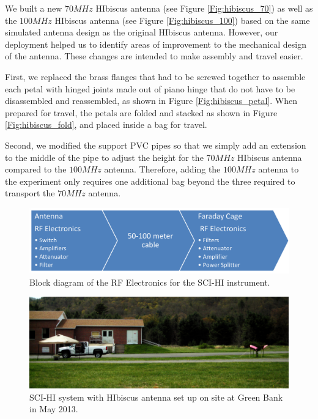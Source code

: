 We built a new $70 MHz$ HIbiscus antenna (see Figure \ref{Fig:hibiscus_70}) as well as the $100 MHz$ HIbiscus antenna (see Figure \ref{Fig:hibiscus_100}) based on the same simulated antenna design as the original HIbiscus antenna. However, our deployment helped us to identify areas of improvement to the mechanical design of the antenna. These changes are intended to make assembly and travel easier. 

First, we replaced the brass flanges that had to be screwed together to assemble each petal with hinged joints made out of piano hinge that do not have to be disassembled and reassembled, as shown in Figure \ref{Fig:hibiscus_petal}. When prepared for travel, the petals are folded and stacked as shown in Figure \ref{Fig:hibiscus_fold}, and placed inside a bag for travel. 

Second, we modified the support PVC pipes so that we simply add an extension to the middle of the pipe to adjust the height for the $70 MHz$ HIbiscus antenna compared to the $100 MHz$ antenna. Therefore, adding the $100 MHz$ antenna to the experiment only requires one additional bag beyond the three required to transport the $70 MHz$ antenna. 

\begin{figure}[htb]
\begin{center}
\includegraphics[width=0.9\linewidth]{SCIHI_system/figures/rf_electronics_block_diagram.png}
\caption{Block diagram of the RF Electronics for the SCI-HI instrument.}
\label{Fig:RF_block_diagram}
\end{center}
\end{figure}

\begin{figure}[htb]
\begin{center}

\includegraphics[width=0.95\linewidth]{SCIHI_system/figures/SCIHI_gbt_sys.jpg}
\caption{SCI-HI system with HIbiscus antenna set up on site at Green Bank in May 2013.}
\label{Fig:sys_gbt}

\end{center}
\end{figure}

